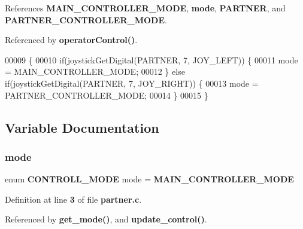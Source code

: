 References \textbf{ M\+A\+I\+N\+\_\+\+C\+O\+N\+T\+R\+O\+L\+L\+E\+R\+\_\+\+M\+O\+DE}, \textbf{ mode}, \textbf{ P\+A\+R\+T\+N\+ER}, and \textbf{ P\+A\+R\+T\+N\+E\+R\+\_\+\+C\+O\+N\+T\+R\+O\+L\+L\+E\+R\+\_\+\+M\+O\+DE}.



Referenced by \textbf{ operator\+Control()}.


\begin{DoxyCode}
00009                       \{
00010   \textcolor{keywordflow}{if}(joystickGetDigital(PARTNER, 7, JOY\_LEFT)) \{
00011     mode = MAIN_CONTROLLER_MODE;
00012   \} \textcolor{keywordflow}{else} \textcolor{keywordflow}{if}(joystickGetDigital(PARTNER, 7, JOY\_RIGHT)) \{
00013     mode = PARTNER_CONTROLLER_MODE;
00014   \}
00015 \}
\end{DoxyCode}


\subsection{Variable Documentation}
\mbox{\label{partner_8c_ac57f7e8cb1c4e638c8c477740314a109}} 
\subsubsection{mode}
{\footnotesize\ttfamily enum \textbf{ C\+O\+N\+T\+R\+O\+L\+L\+\_\+\+M\+O\+DE} mode = \textbf{ M\+A\+I\+N\+\_\+\+C\+O\+N\+T\+R\+O\+L\+L\+E\+R\+\_\+\+M\+O\+DE}\hspace{0.3cm}{\ttfamily [static]}}



Definition at line \textbf{ 3} of file \textbf{ partner.\+c}.



Referenced by \textbf{ get\+\_\+mode()}, and \textbf{ update\+\_\+control()}.

